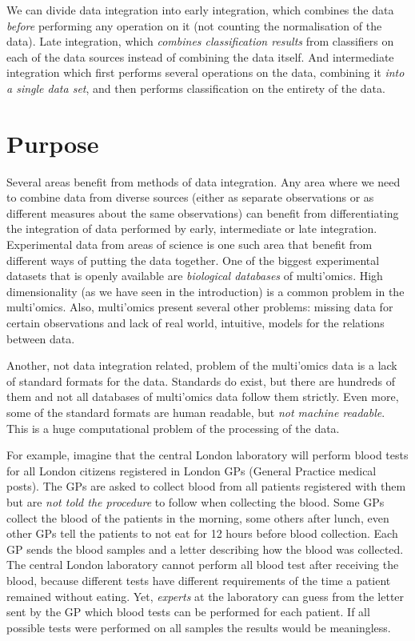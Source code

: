\documentclass[11pt,a4paper,twoside,openright]{report}
\begin{document}
We can divide data integration into early integration, which combines the data
\emph{before} performing any operation on it (not counting the normalisation of
the data).  Late integration, which \emph{combines classification results} from
classifiers on each of the data sources instead of combining the data itself.
And intermediate integration which first performs several operations on the
data, combining it \emph{into a single data set}, and then performs
classification on the entirety of the data.

\section{Purpose}

Several areas benefit from methods of data integration.  Any area where we need
to combine data from diverse sources (either as separate observations or as
different measures about the same observations) can benefit from
differentiating the integration of data performed by early, intermediate or
late integration.  Experimental data from areas of science is one such area
that benefit from different ways of putting the data together.  One of the
biggest experimental datasets that is openly available are \emph{biological
databases} of multi'omics.  High dimensionality (as we have seen in the
introduction) is a common problem in the multi'omics.  Also, multi'omics
present several other problems: missing data for certain observations and lack
of real world, intuitive, models for the relations between data.

Another, not data integration related, problem of the multi'omics data is a
lack of standard formats for the data.  Standards do exist, but there are
hundreds of them and not all databases of multi'omics data follow them
strictly.  Even more, some of the standard formats are human readable, but
\emph{not machine readable}.  This is a huge computational problem of the
processing of the data.

For example, imagine that the central London laboratory will perform blood
tests for all London citizens registered in London GPs (General Practice
medical posts).  The GPs are asked to collect blood from all patients
registered with them but are \emph{not told the procedure} to follow when
collecting the blood.  Some GPs collect the blood of the patients in the
morning, some others after lunch, even other GPs tell the patients to not eat
for 12 hours before blood collection.  Each GP sends the blood samples and a
letter describing how the blood was collected.  The central London laboratory
cannot perform all blood test after receiving the blood, because different
tests have different requirements of the time a patient remained without
eating.  Yet, \emph{experts} at the laboratory can guess from the letter sent
by the GP which blood tests can be performed for each patient.  If all possible
tests were performed on all samples the results would be meaningless.
\end{document}
